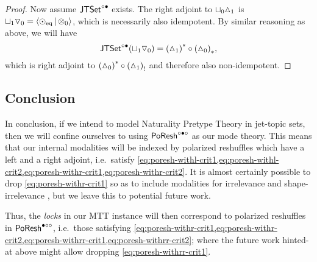 \documentclass[a4paper]{memoir}
\begin{document}
\begin{proof}
	Now assume $\mathsf{JTSet}^{\circ \bullet}$ exists.
	The right adjoint to ${\sqcup}_0 {\vartriangle}_1$ is ${\sqcup}_1 {\triangledown}_0 = \mathopen{}\left\langle {\odot}_{\mathrm{eq}} \,\middle|\, {\otimes}_0 \right\rangle\mathclose{}$, which is necessarily also idempotent.
	By similar reasoning as above, we will have
	\[
		\mathsf{JTSet}^{\circ \bullet}({\sqcup}_1 {\triangledown}_0) = {({\vartriangle}_1)}^* \circ {({\vartriangle}_0)}_*,
	\]
	which is right adjoint to ${({\vartriangle}_0)}^* \circ {({\vartriangle}_1)}_!$ and therefore also non-idempotent.
\end{proof}

\subsection{Conclusion} \label{sec:poresh-jtset:conclusion}
In conclusion, if we intend to model Naturality Pretype Theory in jet-topic sets, then we will confine ourselves to using $\mathsf{PoResh}^{\circ \bullet \circ}$ as our mode theory.
This means that our internal modalities will be indexed by polarized reshuffles which have a left and a right adjoint, i.e.\ satisfy \cref{eq:poresh-withl-crit1,eq:poresh-withl-crit2,eq:poresh-withr-crit1,eq:poresh-withr-crit2}.
It is almost certainly possible to drop \cref{eq:poresh-withr-crit1} so as to include modalities for irrelevance and shape-irrelevance \cite{reldtt}, but we leave this to potential future work.

Thus, the \emph{locks} in our MTT instance will then correspond to polarized reshuffles in $\mathsf{PoResh}^{\bullet \circ \circ}$, i.e.\ those satisfying \cref{eq:poresh-withr-crit1,eq:poresh-withr-crit2,eq:poresh-withrr-crit1,eq:poresh-withrr-crit2}; where the future work hinted-at above might allow dropping \cref{eq:poresh-withrr-crit1}.
\end{document}
